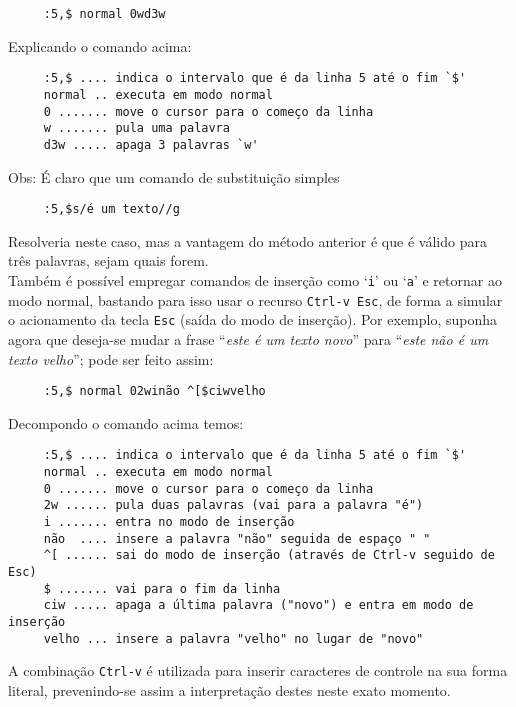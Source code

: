 \begin{verbatim}
     :5,$ normal 0wd3w
\end{verbatim}

Explicando o comando acima:

\begin{verbatim}
     :5,$ .... indica o intervalo que é da linha 5 até o fim `$'
     normal .. executa em modo normal
     0 ....... move o cursor para o começo da linha
     w ....... pula uma palavra
     d3w ..... apaga 3 palavras `w'
\end{verbatim}

Obs: É claro que um comando de substituição simples

\begin{verbatim}
     :5,$s/é um texto//g
\end{verbatim}

Resolveria neste caso, mas a vantagem do método anterior é que
é válido para três palavras, sejam quais forem.\\

Também é possível empregar comandos de inserção como `{\tt i}' ou `{\tt a}' e
retornar ao modo normal, bastando para isso usar o recurso \verb|Ctrl-v Esc|,
de forma a simular o acionamento da tecla \verb|Esc| (saída do modo de
inserção). Por exemplo, suponha agora que deseja-se mudar a frase ``{\em este
é um texto novo}'' para ``{\em este não é um texto velho}''; pode ser feito
assim:

\begin{verbatim}
     :5,$ normal 02winão ^[$ciwvelho
\end{verbatim}

Decompondo o comando acima temos:

\begin{verbatim}
     :5,$ .... indica o intervalo que é da linha 5 até o fim `$'
     normal .. executa em modo normal
     0 ....... move o cursor para o começo da linha
     2w ...... pula duas palavras (vai para a palavra "é")
     i ....... entra no modo de inserção
     não  .... insere a palavra "não" seguida de espaço " "
     ^[ ...... sai do modo de inserção (através de Ctrl-v seguido de Esc)
     $ ....... vai para o fim da linha
     ciw ..... apaga a última palavra ("novo") e entra em modo de inserção
     velho ... insere a palavra "velho" no lugar de "novo"
\end{verbatim}

A combinação \verb|Ctrl-v| é utilizada para inserir caracteres de controle na
sua forma literal, prevenindo-se assim a interpretação destes neste exato
momento.

